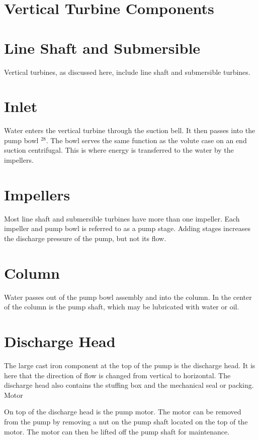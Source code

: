 \documentclass[10pt]{article}
\begin{document}
\section{Vertical Turbine Components}
\section{Line Shaft and Submersible}
Vertical turbines, as discussed here, include line shaft and submersible turbines.

\section{Inlet}
Water enters the vertical turbine through the suction bell. It then passes into the pump bowl ${ }^{28}$. The bowl serves the same function as the volute case on an end suction centrifugal. This is where energy is transferred to the water by the impellers.

\section{Impellers}
Most line shaft and submersible turbines have more than one impeller. Each impeller and pump bowl is referred to as a pump stage. Adding stages increases the discharge pressure of the pump, but not its flow.

\section{Column}
Water passes out of the pump bowl assembly and into the column. In the center of the column is the pump shaft, which may be lubricated with water or oil.

\section{Discharge Head}
The large cast iron component at the top of the pump is the discharge head. It is here that the direction of flow is changed from vertical to horizontal. The discharge head also contains the stuffing box and the mechanical seal or packing. Motor

On top of the discharge head is the pump motor. The motor can be removed from the pump by removing a nut on the pump shaft located on the top of the motor. The motor can then be lifted off the pump shaft for maintenance.
\end{document}
